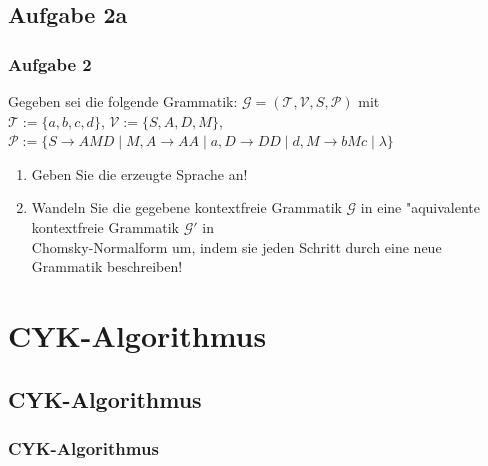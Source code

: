 \subsection{Aufgabe 2a}
\begin{frame}
	\frametitle{Aufgabe 2}
	Gegeben sei die folgende Grammatik: $\mathcal{G} = (\mathcal{T},\mathcal{V},S,
	\mathcal{P})$ mit\\
	$\mathcal{T} := \{a,b,c,d\}$, $\mathcal{V} := \{S,A,D,M\}$, $\mathcal{P} := \{
	S \rightarrow AMD \; | \; M, A \rightarrow AA \; | \; a, D \rightarrow DD \; | \; d,
	M \rightarrow bMc \; | \; \lambda\}$
	\begin{enumerate}
		\item Geben Sie die erzeugte Sprache an!
		\item Wandeln Sie die gegebene kontextfreie Grammatik $\mathcal{G}$ in eine
		"aquivalente kontextfreie Grammatik $\mathcal{G}'$ in\\
		Chomsky-Normalform um, indem sie jeden Schritt durch eine neue Grammatik beschreiben!
	\end{enumerate}
\end{frame}

\section{CYK-Algorithmus}
\subsection{CYK-Algorithmus}
\begin{frame}
	\frametitle{CYK-Algorithmus}
\end{frame}

